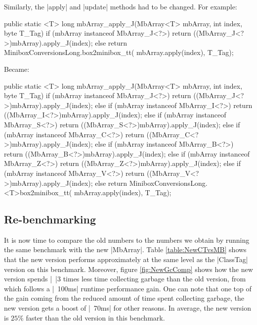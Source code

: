 Similarly, the |apply| and |update| methods had to be changed.
For example:

\begin{lstlisting-nobreak-java}
public static <T> long mbArray_apply_J(MbArray<T> mbArray, int index, byte T_Tag) {
  if (mbArray instanceof MbArray_J<?>)
    return ((MbArray_J<?>)mbArray).apply_J(index);
  else
    return MiniboxConversionsLong.box2minibox_tt(
    	mbArray.apply(index), T_Tag);
}
\end{lstlisting-nobreak-java}

Became:

\begin{lstlisting-nobreak-java}
public static <T> long mbArray_apply_J(MbArray<T> mbArray, int index, byte T_Tag) {
  if (mbArray instanceof MbArray_J<?>)
    return ((MbArray_J<?>)mbArray).apply_J(index);
  else if (mbArray instanceof MbArray_I<?>)
    return ((MbArray_I<?>)mbArray).apply_J(index);
  else if (mbArray instanceof MbArray_S<?>)
    return ((MbArray_S<?>)mbArray).apply_J(index);
  else if (mbArray instanceof MbArray_C<?>)
    return ((MbArray_C<?>)mbArray).apply_J(index);
  else if (mbArray instanceof MbArray_B<?>)
    return ((MbArray_B<?>)mbArray).apply_J(index);
  else if (mbArray instanceof MbArray_Z<?>)
    return ((MbArray_Z<?>)mbArray).apply_J(index);
  else if (mbArray instanceof MbArray_V<?>)
    return ((MbArray_V<?>)mbArray).apply_J(index);
  else
    return MiniboxConversionsLong.<T>box2minibox_tt(
    	mbArray.apply(index), T_Tag);
}
\end{lstlisting-nobreak-java}

\subsection{Re-benchmarking}

It is now time to compare the old numbers to the numbers we obtain by running the same benchmark with the new |MbArray|. Table \ref{table:NewCTvsMB} shows that the new version performs approximately at the same level as the |ClassTag| version on this benchmark. Moreover, figure \ref{fig:NewGcComp} shows how the new version spends |~|3 times less time collecting garbage than the old version, from which follows a |~100ms| runtime performance gain. One can note that one top of the gain coming from the reduced amount of time spent collecting garbage, the new version gets a boost of |~70ms| for other reasons. In average, the new version is $25\%$ faster than the old version in this benchmark.

